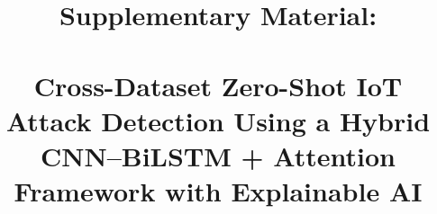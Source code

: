 \documentclass[a4paper,fleqn]{cas-sc}
\begin{document}
\let\WriteBookmarks\relax
\def\floatpagepagefraction{0.5}
\def\textpagefraction{.1}
\renewcommand{\topfraction}{.85}
\renewcommand{\bottomfraction}{.7}
\renewcommand{\textfraction}{.15}
\renewcommand{\floatpagefraction}{.66}


\title [mode = title]{Supplementary Material:\\~\\Cross-Dataset Zero-Shot {IoT} Attack Detection Using a Hybrid {CNN--BiLSTM + Attention} Framework with Explainable {AI}}












\renewcommand{\thetable}{S\arabic{table}}
\renewcommand{\thefigure}{S\arabic{figure}}

\maketitle
\end{document}
